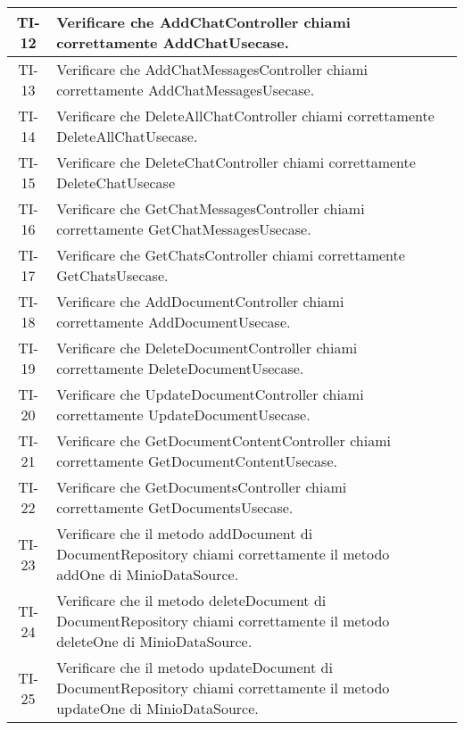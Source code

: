 \begin{xltabular}{\textwidth}{| c | X | c |}
    \hline
    TI-12 & Verificare che AddChatController chiami correttamente AddChatUsecase. & \textcolor{cmarkcolor}{} \\
    \hline
    TI-13 & Verificare che AddChatMessagesController chiami correttamente AddChatMessagesUsecase. & \textcolor{cmarkcolor}{} \\
    \hline
    TI-14 & Verificare che DeleteAllChatController chiami correttamente DeleteAllChatUsecase. & \textcolor{cmarkcolor}{} \\
    \hline
    TI-15 & Verificare che DeleteChatController chiami correttamente DeleteChatUsecase & \textcolor{cmarkcolor}{} \\
    \hline
    TI-16 & Verificare che GetChatMessagesController chiami correttamente GetChatMessagesUsecase. & \textcolor{cmarkcolor}{} \\
    \hline
    TI-17 & Verificare che GetChatsController chiami correttamente GetChatsUsecase. & \textcolor{cmarkcolor}{} \\
    \hline
    TI-18 & Verificare che AddDocumentController chiami correttamente AddDocumentUsecase. & \textcolor{cmarkcolor}{}\\
    \hline
    TI-19 & Verificare che DeleteDocumentController chiami correttamente DeleteDocumentUsecase. & \textcolor{cmarkcolor}{} \\
    \hline
    TI-20 & Verificare che UpdateDocumentController chiami correttamente UpdateDocumentUsecase. & \textcolor{cmarkcolor}{} \\
    \hline
    TI-21 & Verificare che GetDocumentContentController chiami correttamente GetDocumentContentUsecase. & \textcolor{cmarkcolor}{} \\
    \hline
    TI-22 & Verificare che GetDocumentsController chiami correttamente GetDocumentsUsecase. & \textcolor{cmarkcolor}{} \\
    \hline
    TI-23 & Verificare che il metodo addDocument di DocumentRepository chiami correttamente il metodo addOne di MinioDataSource. & \textcolor{cmarkcolor}{} \\
    \hline
    TI-24 & Verificare che il metodo deleteDocument di DocumentRepository chiami correttamente il metodo deleteOne di MinioDataSource. & \textcolor{cmarkcolor}{} \\
    \hline
    TI-25 & Verificare che il metodo updateDocument di DocumentRepository chiami correttamente il metodo updateOne di MinioDataSource. & \textcolor{cmarkcolor}{} \\

\end{xltabular}
